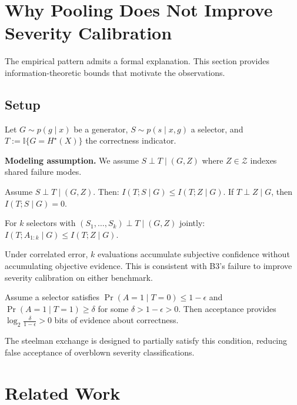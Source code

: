 \documentclass{ws-ijprai}
\begin{document}
\section{Why Pooling Does Not Improve Severity Calibration}
\label{sec:theory}

The empirical pattern admits a formal explanation. This section provides
information-theoretic bounds that motivate the observations.

\subsection{Setup}

Let $G \sim p(g \mid x)$ be a generator, $S \sim p(s \mid x, g)$ a selector,
and $T := \mathbb{I}\{G = H^\star(X)\}$ the correctness indicator.

\textbf{Modeling assumption.} We assume $S \perp T \mid (G, Z)$ where
$Z \in \mathcal{Z}$ indexes shared failure modes.

\begin{theorem}
\label{thm:info_bound}
Assume $S \perp T \mid (G, Z)$. Then:
$I(T; S \mid G) \leq I(T; Z \mid G)$.
If $T \perp Z \mid G$, then $I(T; S \mid G) = 0$.
\end{theorem}

\begin{lemma}
\label{lem:repeated}
For $k$ selectors with $(S_1, \ldots, S_k) \perp T \mid (G, Z)$ jointly:
$I(T; A_{1:k} \mid G) \leq I(T; Z \mid G)$.
\end{lemma}

Under correlated error, $k$ evaluations accumulate subjective confidence
without accumulating objective evidence. This is consistent with B3's failure
to improve severity calibration on either benchmark.

\begin{proposition}
\label{prop:positive}
Assume a selector satisfies $\Pr(A=1 \mid T=0) \leq 1-\epsilon$ and
$\Pr(A=1 \mid T=1) \geq \delta$ for some $\delta > 1-\epsilon > 0$. Then
acceptance provides $\log_2 \frac{\delta}{1-\epsilon} > 0$ bits of evidence
about correctness.
\end{proposition}

The steelman exchange is designed to partially satisfy this condition,
reducing false acceptance of overblown severity classifications.


\section{Related Work}
\end{document}

